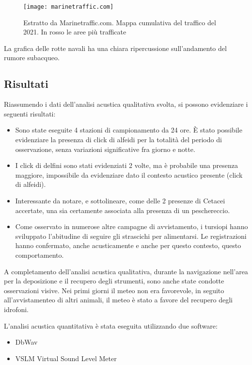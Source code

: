 \begin{figure}[h]
\centering 
\texttt{[image: marinetraffic.com]}
\caption{Estratto da Marinetraffic.com. Mappa cumulativa del traffico del 2021. In rosso le aree più trafficate}
\end{figure} 

La grafica delle rotte navali ha una chiara ripercussione sull’andamento del rumore subacqueo.

\subsection{Risultati}
 
Riassumendo i dati dell’analisi acustica qualitativa svolta, si possono evidenziare i seguenti risultati: 
\begin{itemize} 
\item Sono state eseguite 4 stazioni di campionamento da 24 ore. È stato possibile evidenziare la presenza di click di alfeidi per la totalità del periodo di osservazione, senza variazioni significative fra giorno e notte. 
\item I click di delfini sono stati evidenziati 2 volte, ma è probabile una presenza maggiore, impossibile da evidenziare dato il contesto acustico presente (click di alfeidi). 
\item Interessante da notare, e sottolineare, come delle 2 presenze di Cetacei accertate, una sia certamente associata alla presenza di un peschereccio. 
\item Come osservato in numerose altre campagne di avvistamento, i tursiopi hanno sviluppato l’abitudine di seguire gli strascichi per alimentarsi. 
Le registrazioni hanno confermato, anche acusticamente e anche per questo contesto, questo comportamento. 
\end{itemize} 

A completamento dell’analisi acustica qualitativa, durante la navigazione nell’area per la deposizione e il recupero degli strumenti, sono anche state condotte osservazioni visive. 
Nei primi giorni il meteo non era favorevole, in seguito all'avvistamenteo di altri animali, il meteo è stato a favore del recupero degli idrofoni. 

L'analisi acustica quantitativa è stata eseguita utilizzando due software: 
\begin{itemize}
\item DbWav %
\item VSLM Virtual Sound Level Meter %
\end{itemize} 

